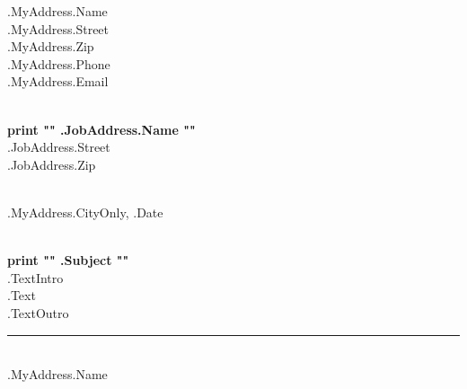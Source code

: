 
\begin{flushright}
{{.MyAddress.Name}}\\
{{.MyAddress.Street}}\\
{{.MyAddress.Zip}}\\
{{.MyAddress.Phone}}\\
{{.MyAddress.Email}}\\
\end{flushright}

\hphantom{}\\[4ex]

\textbf{{ print "{" .JobAddress.Name "}" }}\\
{{.JobAddress.Street}}\\
{{.JobAddress.Zip}}\\

\hphantom{}\\[2ex]

\begin{flushright}
{{.MyAddress.CityOnly}}, {{.Date}}\\
\end{flushright}

\hphantom{}\\[2ex]

\textbf{{ print "{" .Subject "}" }}\\[2ex]

{{ .TextIntro }}\\[1ex]

{{.Text}}\\[1ex]

{{ .TextOutro }}\\[4ex]


\par\noindent\rule{4cm}{0.4pt}\\
{{.MyAddress.Name}}


\restoregeometry
